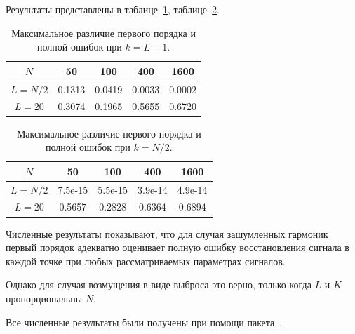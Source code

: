 \documentclass[specialist,
               substylefile = spbu.rtx,
               subf,href,colorlinks=true, 12pt]{disser}
\begin{document}
Результаты представлены в таблице~\ref{tab:const_outl_1}, таблице~\ref{tab:const_outl_2}.

\begin{table}[H]
	\begin{center}
		\caption{Максимальное различие первого порядка и полной ошибок при $k = L - 1$.}
		\label{tab:const_outl_1}
		\begin{tabular}{|c|c|c|c|c|}
			\hline
			$N$	& 50 & 100 & 400 & 1600 \\
			\hline
			$L = N / 2$ & 0.1313  & 0.0419  & 0.0033 & 0.0002 \\
			\hline
			$L = 20$ & 0.3074  & 0.1965  & 0.5655 & 0.6720 \\
			\hline
		\end{tabular}
	\end{center}
\end{table}

\begin{table}[H]
	\begin{center}
		\caption{Максимальное различие первого порядка и полной ошибок при $k = N / 2$.}
		\label{tab:const_outl_2}
		\begin{tabular}{|c|c|c|c|c|}
			\hline
			$N$	& 50 & 100 & 400 & 1600 \\
			\hline
			$L = N / 2$ & 7.5e-15  & 5.5e-15  & 3.9e-14 & 4.9e-14 \\
			\hline
			$L = 20$ & 0.5657  & 0.2828  & 0.6364 & 0.6894 \\
			\hline
		\end{tabular}
	\end{center}
\end{table}

Численные результаты показывают, что для случая зашумленных гармоник первый порядок адекватно оценивает полную ошибку восстановления сигнала в каждой точке при любых рассматриваемых параметрах сигналов.

Однако для случая возмущения в виде выброса это верно, только когда $L$ и $K$ пропорциональны $N$.

Все численные результаты были получены при помощи пакета~\cite{Korobeynikov.etal2014}.
\end{document}
